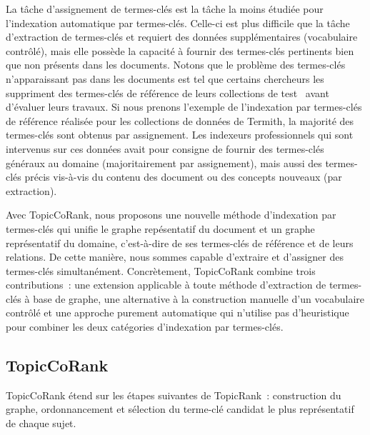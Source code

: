    La tâche d'assignement de termes-clés est la tâche la moins étudiée pour
    l'indexation automatique par termes-clés. Celle-ci est plus difficile que la
    tâche d'extraction de termes-clés et requiert des données supplémentaires
    (vocabulaire contrôlé), mais elle possède la capacité à fournir des
    termes-clés pertinents bien que non présents dans les documents. Notons que
    le problème des termes-clés n'apparaissant pas dans les documents est
    tel que certains chercheurs les suppriment des termes-clés de référence de
    leurs collections de test~\cite{hassan2010conundrums} avant d'évaluer leurs
    travaux. Si nous prenons l'exemple de l'indexation par termes-clés de
    référence réalisée pour les collections de données de Termith, la majorité
    des termes-clés sont obtenus par assignement. Les indexeurs professionnels
    qui sont intervenus sur ces données avait pour consigne de fournir des
    termes-clés généraux au domaine (majoritairement par assignement), mais
    aussi  des termes-clés précis vis-à-vis du contenu des document ou des
    concepts nouveaux (par extraction). 

    Avec TopicCoRank, nous proposons une nouvelle méthode d'indexation par
    termes-clés qui unifie le graphe repésentatif du document et un graphe
    représentatif du domaine, c'est-à-dire de ses termes-clés de référence et de
    leurs relations. De cette manière, nous sommes capable d'extraire et
    d'assigner des termes-clés simultanément. Concrètement, TopicCoRank combine
    trois contributions~: une extension applicable à toute méthode d'extraction
    de termes-clés à base de graphe, une alternative à la construction manuelle
    d'un vocabulaire contrôlé et une approche purement automatique qui n'utilise
    pas d'heuristique pour combiner les deux catégories d'indexation par
    termes-clés.

    \subsection{TopicCoRank}
    \label{subsec:main-automatic_keyphrase_annotation-supervised_automatic_keyphrase_annotation-topiccorank}
      TopicCoRank étend sur les étapes suivantes de TopicRank~: construction du
      graphe, ordonnancement et sélection du terme-clé candidat le plus
      représentatif de chaque sujet.

